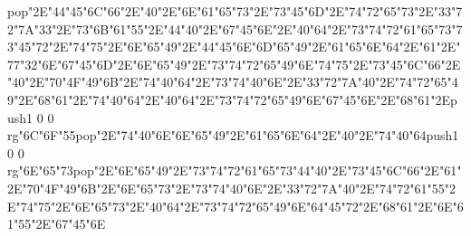 pop{}\ipa\char"2E\ipa\char"44\ipa\char"45\ipa\char"6C\ipa\char"66\ipa\char"2E\ipa\char"40\ipa\char"2E\ipa\char"6E\ipa\char"61\ipa\char"65\ipa\char"73\ipa\char"2E\ipa\char"73\ipa\char"45\ipa\char"6D\ipa\char"2E\ipa\char"74\ipa\char"72\ipa\char"65\ipa\char"73\ipa\char"2E\ipa\char"33\ipa\char"72\ipa\char"7A\medskip\ipa\char"33\ipa\char"2E\ipa\char"73\ipa\char"6B\ipa\char"61\ipa\char"55\ipa\char"2E\ipa\char"44\ipa\char"40\ipa\char"2E\ipa\char"67\ipa\char"45\ipa\char"6E\ipa\char"2E\ipa\char"40\ipa\char"64\ipa\char"2E\ipa\char"73\ipa\char"74\ipa\char"72\ipa\char"61\ipa\char"65\ipa\char"73\medskip\ipa\char"73\ipa\char"45\ipa\char"72\ipa\char"2E\ipa\char"74\ipa\char"75\ipa\char"2E\ipa\char"6E\ipa\char"65\ipa\char"49\ipa\char"2E\ipa\char"44\ipa\char"45\ipa\char"6E\medskip\vfill\eject\ipa\char"6D\ipa\char"65\ipa\char"49\ipa\char"2E\ipa\char"61\ipa\char"65\ipa\char"6E\ipa\char"64\ipa\char"2E\ipa\char"61\ipa\char"2E\ipa\char"77\ipa\char"32\ipa\char"6E\medskip\ipa\char"67\ipa\char"45\ipa\char"6D\ipa\char"2E\ipa\char"6E\ipa\char"65\ipa\char"49\ipa\char"2E\ipa\char"73\ipa\char"74\ipa\char"72\ipa\char"65\ipa\char"49\ipa\char"6E\medskip\ipa\char"74\ipa\char"75\ipa\char"2E\ipa\char"73\ipa\char"45\ipa\char"6C\ipa\char"66\ipa\char"2E\ipa\char"40\ipa\char"2E\ipa\char"70\ipa\char"4F\ipa\char"49\ipa\char"6B\ipa\char"2E\ipa\char"74\ipa\char"40\ipa\char"64\ipa\char"2E\ipa\char"73\ipa\char"74\ipa\char"40\ipa\char"6E\ipa\char"2E\ipa\char"33\ipa\char"72\ipa\char"7A\medskip\ipa\char"40\ipa\char"2E\ipa\char"74\ipa\char"72\ipa\char"65\ipa\char"49\ipa\char"2E\ipa\char"68\ipa\char"61\ipa\char"2E\ipa\char"74\ipa\char"40\ipa\char"64\ipa\char"2E\ipa\char"40\ipa\char"64\ipa\char"2E\ipa\char"73\ipa\char"74\ipa\char"72\ipa\char"65\ipa\char"49\ipa\char"6E\medskip\ipa\char"67\ipa\char"45\ipa\char"6E\ipa\char"2E\ipa\char"68\ipa\char"61\ipa\char"2E\pdfcolorstack\match push{1 0 0 rg}\ipa\char"6C\ipa\char"6F\ipa\char"55\pdfcolorstack\match pop{}\ipa\char"2E\ipa\char"74\ipa\char"40\ipa\char"6E\medskip\vfill\eject\ipa\char"6E\ipa\char"65\ipa\char"49\ipa\char"2E\ipa\char"61\ipa\char"65\ipa\char"6E\ipa\char"64\ipa\char"2E\ipa\char"40\ipa\char"2E\ipa\char"74\ipa\char"40\ipa\char"64\medskip\pdfcolorstack\match push{1 0 0 rg}\ipa\char"6E\ipa\char"65\ipa\char"73\pdfcolorstack\match pop{}\ipa\char"2E\ipa\char"6E\ipa\char"65\ipa\char"49\ipa\char"2E\ipa\char"73\ipa\char"74\ipa\char"72\ipa\char"61\ipa\char"65\ipa\char"73\medskip\ipa\char"44\ipa\char"40\ipa\char"2E\ipa\char"73\ipa\char"45\ipa\char"6C\ipa\char"66\ipa\char"2E\ipa\char"61\ipa\char"2E\ipa\char"70\ipa\char"4F\ipa\char"49\ipa\char"6B\ipa\char"2E\ipa\char"6E\ipa\char"65\ipa\char"73\ipa\char"2E\ipa\char"73\ipa\char"74\ipa\char"40\ipa\char"6E\ipa\char"2E\ipa\char"33\ipa\char"72\ipa\char"7A\medskip\ipa\char"40\ipa\char"2E\ipa\char"74\ipa\char"72\ipa\char"61\ipa\char"55\ipa\char"2E\ipa\char"74\ipa\char"75\ipa\char"2E\ipa\char"6E\ipa\char"65\ipa\char"73\ipa\char"2E\ipa\char"40\ipa\char"64\ipa\char"2E\ipa\char"73\ipa\char"74\ipa\char"72\ipa\char"65\ipa\char"49\ipa\char"6E\medskip\ipa\char"64\ipa\char"45\ipa\char"72\ipa\char"2E\ipa\char"68\ipa\char"61\ipa\char"2E\ipa\char"6E\ipa\char"61\ipa\char"55\ipa\char"2E\ipa\char"67\ipa\char"45\ipa\char"6E\medskip\vfill\bye